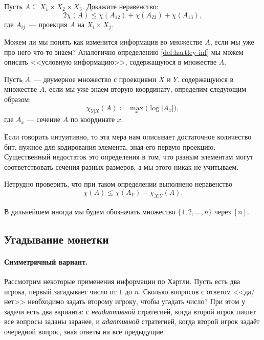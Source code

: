 \begin{exercise}
	Пусть $A \subseteq X_1 \times X_2 \times X_3$. Докажите неравенство:
	$$
        2\chi(A) \le \chi(A_{12}) + \chi(A_{23}) + \chi(A_{13}),
    $$
    где $A_{ij}$~--- проекция $A$ на $X_i \times X_j$.
\end{exercise}

Можем ли мы понять как изменится информация во множестве $A$, если мы уже про него что-то знаем?
Аналогично определению \ref{def:hartley-inf} мы можем описать <<условную информацию>>, содержащуюся в
множестве $A$.

\begin{definition}
	Пусть $A$~--- двумерное множество с проекциями $X$ и $Y$.  содержащуюся
    в множестве $A$, если мы уже знаем вторую координату, определим следующим образом: 
	$$
        \chi_{Y|X}(A) \coloneqq \max_x{\big(\log|A_x|\big)},
    $$ 
	где $A_x$ --- сечение $A$ по координате $x$.
\end{definition}

Если говорить интуитивно, то эта мера нам описывает достаточное количество бит, нужное для кодирования
элемента, зная его первую проекцию. Существенный недостаток это определения в том, что разным элементам
могут соответствовать сечения разных размеров, а мы этого никак не учитываем.

Нетрудно проверить, что при таком определении выполнено неравенство
$$
    \chi(A) \le \chi(A_Y) + \chi_{X|Y}(A).
$$


В дальнейшем иногда мы будем обозначать множество  $\{1, 2, \dots, n\}$ через $[n]$.

\subsection{Угадывание монетки}

\paragraph{Симметричный вариант.}
Рассмотрим некоторые применения информации по Хартли. Пусть есть два игрока, первый загадывает число от
$1$ до $n$. Сколько вопросов с ответом <<да/нет>> необходимо задать второму игроку, чтобы угадать число?
При этом у задачи есть два варианта: с \textit{неадаптивной} стратегией, когда второй игрок пишет все
вопросы заданы заранее, и \textit{адаптивной} стратегией, когда второй игрок задаёт очередной вопрос,
зная ответы на все предыдущие.  

